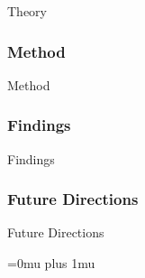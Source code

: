 \noindent
Theory

\subsubsection{Method}

\noindent
Method

\subsubsection{Findings}

\noindent
Findings

\subsubsection{Future Directions}

\noindent
Future Directions 

\Urlmuskip=0mu plus 1mu\relax
\pagebreak
